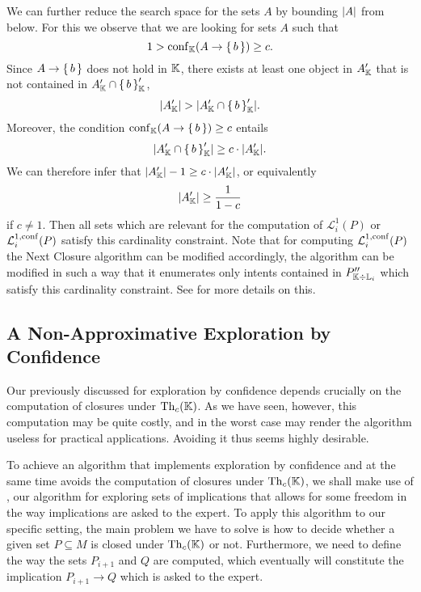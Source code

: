 We can further reduce the search space for the sets $A$ by bounding $\lvert A\rvert$ from below.
For this we observe that we are looking for sets $A$ such that
\begin{equation*}
  1 > \operatorname{conf}_{{\mathbb{K}}}(A \to {\ensuremath{\{\,b\,\}}}) \ge c.
\end{equation*}
Since $A \to {\ensuremath{\{\,b\,\}}}$ does not hold in ${\mathbb{K}}$, there exists at least one object in
$A_{{\mathbb{K}}}'$ that is not contained in $A_{{\mathbb{K}}}' \cap {\ensuremath{\{\,b\,\}}}_{{\mathbb{K}}}'$, \ie
\begin{equation*}
  \lvert A_{{\mathbb{K}}}' \rvert > \lvert A_{{\mathbb{K}}}' \cap {\ensuremath{\{\, b \,\}}}_{{\mathbb{K}}}' \rvert.
\end{equation*}
Moreover, the condition $\operatorname{conf}_{{\mathbb{K}}}(A \to {\ensuremath{\{\,b\,\}}}) \ge c$ entails
\begin{equation*}
  \lvert A_{{\mathbb{K}}}' \cap {\ensuremath{\{\,b\,\}}}_{{\mathbb{K}}}' \rvert \ge c \cdot \lvert A_{{\mathbb{K}}}'\rvert.
\end{equation*}
We can therefore infer that $\lvert A_{{\mathbb{K}}}'\rvert - 1 \geq c \cdot \lvert A_{{\mathbb{K}}}'\rvert$, or
equivalently
\begin{equation*}
  \lvert A_{{\mathbb{K}}}'\rvert \geq \frac{1}{1 - c}
\end{equation*}
if $c \neq 1$.  Then all sets which are relevant for the computation of
$\mathcal{L}_{i}^{1}(P)$ or $\mathcal{L}_{i}^{1,\operatorname{conf}}(P)$ satisfy this cardinality
constraint.  Note that for computing $\mathcal{L}_{i}^{1,\operatorname{conf}}(P)$ the Next Closure
algorithm can be modified accordingly, \ie the algorithm can be modified in such a way
that it enumerates only intents contained in $P_{{\mathbb{K}} \div {\ensuremath{\mathbb{L}}}_{i}}''$ which satisfy
this cardinality constraint.  See \cite[Theorem~51]{fca-book} for more details on this.

\subsection{A Non-Approximative Exploration by Confidence}
\label{sec:poss-fast-expl}

Our previously discussed  for
exploration by confidence depends crucially on the computation of closures under
$\operatorname{Th}_{c}({\mathbb{K}})$.  As we have seen, however, this computation may be quite costly, and in
the worst case may render the algorithm useless for practical applications.  Avoiding it
thus seems highly desirable.

To achieve an algorithm that implements exploration by confidence and at the same time
avoids the computation of closures under $\operatorname{Th}_{c}({\mathbb{K}})$, we shall make use of
, our algorithm for exploring sets of
implications that allows for some freedom in the way implications are asked to the expert.
To apply this algorithm to our specific setting, the main problem we have to solve is how
to decide whether a given set $P \subseteq M$ is closed under $\operatorname{Th}_{c}({\mathbb{K}})$ or not.
Furthermore, we need to define the way the sets $P_{i+1}$ and $Q$ are computed, which
eventually will constitute the implication $P_{i+1} \to Q$ which is asked to the expert.

